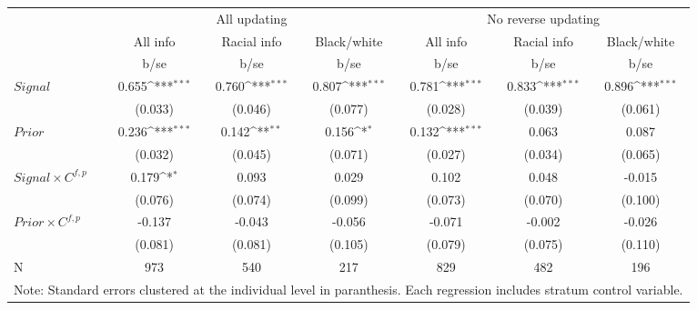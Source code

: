 {
\def\sym#1{\ifmmode^{#1}\else\(^{#1}\)\fi}
\begin{tabular}{l*{6}{c}}
\hline\hline
            &\multicolumn{3}{c}{All updating}                                 &\multicolumn{3}{c}{No reverse updating}                          \\\cmidrule(lr){2-4}\cmidrule(lr){5-7}
            &    All info         & Racial info         & Black/white         &    All info         & Racial info         & Black/white         \\
            &        b/se         &        b/se         &        b/se         &        b/se         &        b/se         &        b/se         \\
\hline
$Signal$      &       0.655\sym{***}&       0.760\sym{***}&       0.807\sym{***}&       0.781\sym{***}&       0.833\sym{***}&       0.896\sym{***}\\
            &     (0.033)         &     (0.046)         &     (0.077)         &     (0.028)         &     (0.039)         &     (0.061)         \\
$Prior$       &       0.236\sym{***}&       0.142\sym{**} &       0.156\sym{*}  &       0.132\sym{***}&       0.063         &       0.087         \\
            &     (0.032)         &     (0.045)         &     (0.071)         &     (0.027)         &     (0.034)         &     (0.065)         \\
$Signal\times C^{f,p}$&       0.179\sym{*}  &       0.093         &       0.029         &       0.102         &       0.048         &      -0.015         \\
            &     (0.076)         &     (0.074)         &     (0.099)         &     (0.073)         &     (0.070)         &     (0.100)         \\
$Prior\times C^{f,p}$&      -0.137         &      -0.043         &      -0.056         &      -0.071         &      -0.002         &      -0.026         \\
            &     (0.081)         &     (0.081)         &     (0.105)         &     (0.079)         &     (0.075)         &     (0.110)         \\
\hline
N           &         973         &         540         &         217         &         829         &         482         &         196         \\
\hline\hline
\multicolumn{7}{l}{\footnotesize Note: Standard errors clustered at the individual level in paranthesis. Each regression includes stratum control variable.}\\
\end{tabular}
}
